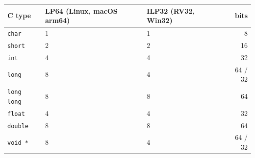 \begin{center}
\begin{tabularx}{0.9\linewidth}{lXXr}
\toprule
\textbf{C type} & \textbf{LP64 (Linux, macOS arm64)}
                & \textbf{ILP32 (RV32, Win32)} & \textbf{bits} \\
\midrule
\texttt{char}        & 1 & 1 & 8 \\
\texttt{short}       & 2 & 2 & 16 \\
\texttt{int}         & 4 & 4 & 32 \\
\texttt{long}        & 8 & 4 & 64 / 32 \\
\texttt{long long}   & 8 & 8 & 64 \\
\texttt{float}       & 4 & 4 & 32 \\
\texttt{double}      & 8 & 8 & 64 \\
\texttt{void *}      & 8 & 4 & 64 / 32 \\
\bottomrule
\end{tabularx}
\end{center}
